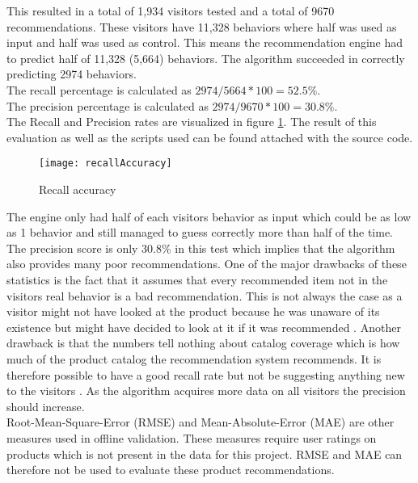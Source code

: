 This resulted in a total of 1,934 visitors tested and a total of 9670 recommendations. These visitors have 11,328 behaviors where half was used as input and half was used as control. This means the recommendation engine had to predict half of 11,328 (5,664) behaviors. The algorithm succeeded in correctly predicting 2974 behaviors.  \\
The recall percentage is calculated as \begin{math}2974/5664*100=52.5\%\end{math}. \\ The precision percentage is calculated as \begin{math}2974/9670*100=30.8\%\end{math}. \\
The Recall and Precision rates are visualized in figure \ref{recallAccuracy}. The result of this evaluation as well as the scripts used can be found attached with the source code. \\
\begin{figure}[H]
\centering
\texttt{[image: recallAccuracy]}
\caption{Recall accuracy}
\label{recallAccuracy}
\end{figure}
The engine only had half of each visitors behavior as input which could be as low as 1 behavior and still managed to guess correctly more than half of the time.
The precision score is only 30.8\% in this test which implies that the algorithm also provides many poor recommendations. One of the major drawbacks of these statistics is the fact that it assumes that every recommended item not in the visitors real behavior is a bad recommendation. This is not always the case as a visitor might not have looked at the product because he was unaware of its existence but might have decided to look at it if it was recommended \cite{evaluatingRecommender}. Another drawback is that the numbers tell nothing about catalog coverage which is how much of the product catalog the recommendation system recommends. It is therefore possible to have a good recall rate but not be suggesting anything new to the visitors \cite{eval}.
As the algorithm acquires more data on all visitors the precision should increase.\\
Root-Mean-Square-Error (RMSE) and Mean-Absolute-Error (MAE) \cite{rmseAndmae} are other measures used in offline validation. These measures require user ratings on products which is not present in the data for this project. RMSE and MAE can therefore not be used to evaluate these product recommendations. \\
